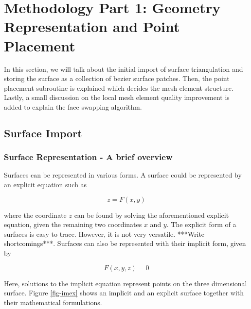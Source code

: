 \chapter{Methodology Part 1: Geometry Representation and Point Placement}

In this section, we will talk about the initial import of surface triangulation and storing the surface as a collection of bezier surface patches. Then, the point placement subroutine is explained which decides the mesh element structure. Lastly, a small discussion on the local mesh element quality improvement is added to explain the face swapping algorithm. 

\section{Surface Import}

\subsection{Surface Representation - A brief overview}

Surfaces can be represented in various forms. A surface could be represented by an explicit equation such as

\begin{equation}
z = F(x,y)
\end{equation}

where the coordinate $z$ can be found by solving the aforementioned explicit equation, given the remaining two coordinates $x$ and $y$. The explicit form of a surfaces is easy to trace. However, it is not very versatile. ***Write shortcomings***. Surfaces can also be represented with their implicit form, given by

\begin{equation}
F(x, y, z) = 0
\end{equation}

Here, solutions to the implicit equation represent points on the three dimensional surface. Figure \ref{fig-imex} shows an implicit and an explicit surface together with their mathematical formulations.

